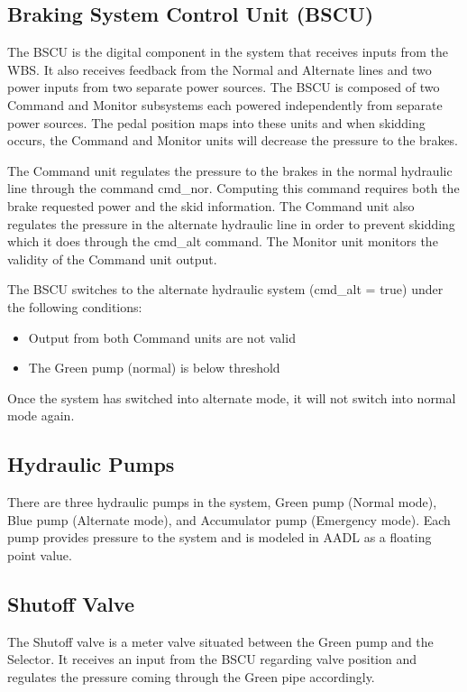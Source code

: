 \subsection{Braking System Control Unit (BSCU)}
The BSCU is the digital component in the system that receives inputs from the WBS. It also receives feedback from the Normal and Alternate lines and two power inputs from two separate power sources. The BSCU is composed of two Command and Monitor subsystems each powered independently from separate power sources. The pedal position maps into these units and when skidding occurs, the Command and Monitor units will decrease the pressure to the brakes. 

The Command unit regulates the pressure to the brakes in the normal hydraulic line through the command cmd\_nor. Computing this command requires both the brake requested power and the skid information. The Command unit also regulates the pressure in the alternate hydraulic line in order to prevent skidding which it does through the cmd\_alt command. The Monitor unit monitors the validity of the Command unit output. 

The BSCU switches to the alternate hydraulic system (cmd\_alt = true) under the following conditions:
\begin{itemize}
\item Output from both Command units are not valid
\item The Green pump (normal) is below threshold
\end{itemize}

Once the system has switched into alternate mode, it will not switch into normal mode again. 

\subsection{Hydraulic Pumps}
There are three hydraulic pumps in the system, Green pump (Normal mode), Blue pump (Alternate mode), and Accumulator pump (Emergency mode). Each pump provides pressure to the system and is modeled in AADL as a floating point value. 

\subsection{Shutoff Valve}

The Shutoff valve is a meter valve situated between the Green pump and the Selector. It receives an input from the BSCU regarding valve position and regulates the pressure coming through the Green pipe accordingly.  

